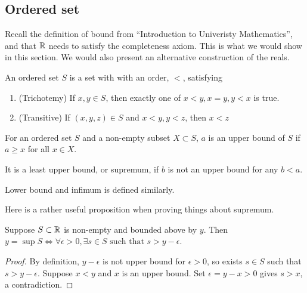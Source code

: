 \documentclass[11pt]{article}
\begin{document}

\subsection{Ordered set}
Recall the definition of bound from ``Introduction to Univeristy Mathematics'', and that \(\mathbb{R}\) needs to satisfy the completeness axiom. This is what we would show in this section. We would also present an alternative construction of the reals.

\begin{definition}
  An ordered set \(S\) is a set with with an order, \(<\), satisfying
  \begin{enumerate}
    \item (Trichotemy) If \(x,y\in S\), then exactly one of \(x<y,x=y,y<x\) is true.
    \item (Transitive) If \((x,y,z)\in S\) and \(x<y,y<z\), then \(x<z\)
  \end{enumerate}
\end{definition}

\begin{definition}
  For an ordered set \(S\) and a non-empty subset \(X\subset S\), \(a\) is an upper bound of \(S\) if \(a\geq x\) for all \(x\in X\). 

  It is a least upper bound, or supremum, if \(b\) is not an upper bound for any \(b<a\).

  Lower bound and infimum is defined similarly.
\end{definition}

Here is a rather useful proposition when proving things about supremum.
\begin{proposition}[][1]
  Suppose \(S\subset \mathbb{R}\) is non-empty and bounded above by \(y\). Then \(y=\sup S \iff \forall \epsilon>0, \exists s\in S \text{ such that } s>y-\epsilon\).
\end{proposition}
\begin{proof}
  \subproof{\(\implies\)}
  By definition, \(y-\epsilon\) is not upper bound for \(\epsilon >0\), so exists \(s\in S\) such that \(s>y-\epsilon\).
  \subproof{\(\impliedby\)}
  Suppose \(x<y\) and \(x\) is an upper bound. Set \(\epsilon=y-x>0\) gives \(s>x\), a contradiction.
\end{proof}
\end{document}
